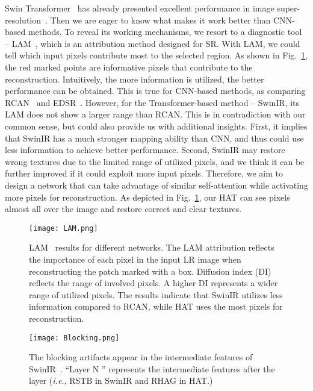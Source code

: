 \documentclass[10pt,twocolumn,letterpaper]{article}
\begin{document}
Swin Transformer~\cite{swin_t} has already presented excellent performance in image super-resolution~\cite{swinir}. Then we are eager to know what makes it work better than CNN-based methods. To reveal its working mechanisms, we resort to a diagnostic tool -- LAM~\cite{lam}, which is an attribution method designed for SR. With LAM, we could tell which input pixels contribute most to the selected region. As shown in Fig.~\ref{lam}, the red marked points are informative pixels that contribute to the reconstruction. Intuitively, the more information is utilized, the better performance can be obtained. This is true for CNN-based methods, as comparing RCAN~\cite{rcan} and EDSR~\cite{edsr}. However, for the Transformer-based method -- SwinIR, its LAM does not show a larger range than RCAN. This is in contradiction with our common sense, but could also provide us with additional insights. First, it implies that SwinIR has a much stronger mapping ability than CNN, and thus could use less information to achieve better performance. Second, SwinIR may restore wrong textures due to the limited range of utilized pixels, and we think it can be further improved if it could exploit more input pixels. Therefore, we aim to design a network that can take advantage of similar self-attention while activating more pixels for reconstruction. As depicted in Fig.~\ref{lam}, our HAT can see pixels almost all over the image and restore correct and clear textures. 



\begin{figure}[!t]
\centering
\texttt{[image: LAM.png]}
\vspace{-0.3cm}
\caption{LAM~\cite{lam} results for different networks. The LAM attribution reflects the importance of each pixel in the input LR image when reconstructing the patch marked with a box.
Diffusion index (DI)~\cite{lam} reflects the range of involved pixels. A higher DI represents a wider range of utilized pixels. The results indicate that SwinIR utilizes less information compared to RCAN, while HAT uses the most pixels for reconstruction.}
\label{lam}
\vspace{-0.4cm}
\end{figure}

\begin{figure}[!t]
\centering
\texttt{[image: Blocking.png]}
\vspace{-0.4cm}
\caption{The blocking artifacts appear in the intermediate features of SwinIR~\cite{swinir}. “Layer N ” represents the intermediate features after the  layer (\textit{i.e.}, RSTB in SwinIR and RHAG in HAT.)}
\label{feature}
\vspace{-0.6cm}
\end{figure}
\end{document}
